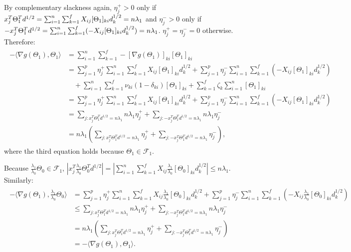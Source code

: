 By complementary slackness again, $\eta^+_j>0$ only if $x_j^T\Theta_{1}^Td^{1/2}\\=\sum_{i=1}^n\sum_{k=1}^fX_{ij}[\Theta_1]_{ki}d_k^{1/2}=n\lambda_1$ and $\eta^-_j>0$ only if $-x_j^T\Theta_{1}^Td^{1/2}\\=\sum_{i=1}^n\sum_{k=1}^f(-X_{ij}[\Theta_1]_{ki}d_k^{1/2})=n\lambda_1$. $\eta^+_j=\eta^-_j=0$ otherwise. Therefore:
\begin{gather}
    \label{eq:thm2.5}
    \begin{aligned}
        -\langle\nabla g(\Theta_{1}),\Theta_{1}\rangle&=\sum_{i=1}^n\sum_{k=1}^f-[\nabla g(\Theta_{1})]_{ki}[\Theta_1]_{ki}\\
        &=\sum_{j=1}^p\eta^+_j\sum_{i=1}^n\sum_{k=1}^fX_{ij}[\Theta_1]_{ki}d_k^{1/2}+\sum_{j=1}^p\eta^-_j\sum_{i=1}^n\sum_{k=1}^f(-X_{ij}[\Theta_1]_{ki}d_k^{1/2})\\
        &\quad+\sum_{i=1}^n\sum_{k=1}^f\nu_{ki}(1-\delta_{ki})[\Theta_1]_{ki}+\sum_{k=1}^f\zeta_{k}\sum_{i=1}^n[\Theta_1]_{ki}\\
        &=\sum_{j=1}^p\eta^+_j\sum_{i=1}^n\sum_{k=1}^fX_{ij}[\Theta_1]_{ki}d_k^{1/2}+\sum_{j=1}^p\eta^-_j\sum_{i=1}^n\sum_{k=1}^f(-X_{ij}[\Theta_1]_{ki}d_k^{1/2})\\
        &=\sum_{j:x_j^T\Theta_{1}^Td^{1/2}=n\lambda_1}n\lambda_1\eta_j^++\sum_{j:-x_j^T\Theta_{1}^Td^{1/2}=n\lambda_1}n\lambda_1\eta_j^-\\
        &=n\lambda_1\left(\sum_{j:x_j^T\Theta_{1}^Td^{1/2}=n\lambda_1}\eta_j^++\sum_{j:-x_j^T\Theta_{1}^Td^{1/2}=n\lambda_1}\eta_j^-\right),
    \end{aligned}
\end{gather}
where the third equation holds because $\Theta_{1}\in\mathcal{F}_{1}$.

Because $\frac{\lambda_1}{\lambda_0}\Theta_{0}\in \mathcal{F}_{1}$, $\left|x_j^T\frac{\lambda_1}{\lambda_0}\Theta_{0}^Td^{1/2}\right|=\left|\sum_{i=1}^n\sum_{k=1}^fX_{ij}\frac{\lambda_1}{\lambda_0}[\Theta_0]_{ki}d_k^{1/2}\right|\leq n\lambda_1$. Similarly:
\begin{gather}
    \label{eq:thm2.6}
    \begin{aligned}
        -\langle\nabla g(\Theta_{1}),\frac{\lambda_1}{\lambda_0}\Theta_{0}\rangle
        &=\sum_{j=1}^p\eta^+_j\sum_{i=1}^n\sum_{k=1}^fX_{ij}\frac{\lambda_1}{\lambda_0}[\Theta_0]_{ki}d_k^{1/2}+\sum_{j=1}^p\eta^-_j\sum_{i=1}^n\sum_{k=1}^f(-X_{ij}\frac{\lambda_1}{\lambda_0}[\Theta_0]_{ki}d_k^{1/2})\\
        &\leq\sum_{j:x_j^T\Theta_{1}^Td^{1/2}=n\lambda_1}n\lambda_1\eta_j^++\sum_{j:-x_j^T\Theta_{1}^Td^{1/2}=n\lambda_1}n\lambda_1\eta_j^-\\
        &=n\lambda_1\left(\sum_{j:x_j^T\Theta_{1}^Td^{1/2}=n\lambda_1}\eta_j^++\sum_{j:-x_j^T\Theta_{1}^Td^{1/2}=n\lambda_1}\eta_j^-\right)\\
        &=-\langle\nabla g(\Theta_{1}),\Theta_{1}\rangle.
    \end{aligned}
\end{gather}


